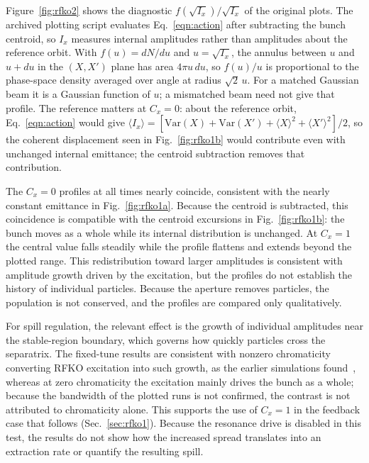 \documentclass[a4paper,fleqn]{cas-sc}
\begin{document}
Figure~\ref{fig:rfko2} shows the diagnostic $f(\sqrt{I_x})/\sqrt{I_x}$ of the original plots. The archived plotting script evaluates Eq.~\eqref{eqn:action} after subtracting the bunch centroid, so $I_x$ measures internal amplitudes rather than amplitudes about the reference orbit. With $f(u)=dN/du$ and $u=\sqrt{I_x}$, the annulus between $u$ and $u+du$ in the $(X,X')$ plane has area $4\pi u\,du$, so $f(u)/u$ is proportional to the phase-space density averaged over angle at radius $\sqrt{2}\,u$. For a matched Gaussian beam it is a Gaussian function of $u$; a mismatched beam need not give that profile. The reference matters at $C_x=0$: about the reference orbit, Eq.~\eqref{eqn:action} would give $\langle I_x\rangle=[\mathrm{Var}(X)+\mathrm{Var}(X')+\langle X\rangle^2+\langle X'\rangle^2]/2$, so the coherent displacement seen in Fig.~\ref{fig:rfko1b} would contribute even with unchanged internal emittance; the centroid subtraction removes that contribution.

The $C_x=0$ profiles at all times nearly coincide, consistent with the nearly constant emittance in Fig.~\ref{fig:rfko1a}. Because the centroid is subtracted, this coincidence is compatible with the centroid excursions in Fig.~\ref{fig:rfko1b}: the bunch moves as a whole while its internal distribution is unchanged. At $C_x=1$ the central value falls steadily while the profile flattens and extends beyond the plotted range. This redistribution toward larger amplitudes is consistent with amplitude growth driven by the excitation, but the profiles do not establish the history of individual particles. Because the aperture removes particles, the population is not conserved, and the profiles are compared only qualitatively.

For spill regulation, the relevant effect is the growth of individual amplitudes near the stable-region boundary, which governs how quickly particles cross the separatrix. The fixed-tune results are consistent with nonzero chromaticity converting RFKO excitation into such growth, as the earlier simulations found~\cite{ipac11}, whereas at zero chromaticity the excitation mainly drives the bunch as a whole; because the bandwidth of the plotted runs is not confirmed, the contrast is not attributed to chromaticity alone. This supports the use of $C_x=1$ in the feedback case that follows (Sec.~\ref{sec:rfko1}). Because the resonance drive is disabled in this test, the results do not show how the increased spread translates into an extraction rate or quantify the resulting spill.
\end{document}
